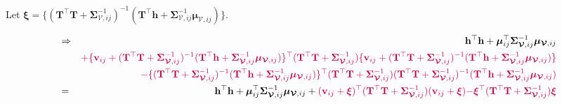 \documentclass[12pt]{article}
\newcommand{\0}{\mathbf{0}}
\begin{document}
Let $\boldsymbol{\xi} = \{ ( \mathbf{T}^{\top} \mathbf{T} + \boldsymbol{\Sigma}_{\boldsymbol{\mathcal{V}}, ij}^{-1} )^{-1} ( \mathbf{T}^{\top} \mathbf{h} + \boldsymbol{\Sigma}_{\boldsymbol{\mathcal{V}}, ij}^{-1}\boldsymbol{\mu}_{\boldsymbol{\mathcal{V}}, ij} ) \}$.

\begin{eqnarray*}
& \Rightarrow & \mathbf{h}^{\top} \mathbf{h} + \boldsymbol{\mu}_{ij}^{\top} \boldsymbol{\Sigma}_{\boldsymbol{\mathcal{V}}, ij}^{-1} \boldsymbol{\mu}_{\boldsymbol{\mathcal{V}}, ij} \\
&& \textcolor{purple}{  +  \{ \mathbf{v}_{ij} + ( \mathbf{T}^{\top} \mathbf{T} + \boldsymbol{\Sigma}_{\boldsymbol{\mathcal{V}}, ij}^{-1} )^{-1} ( \mathbf{T}^{\top} \mathbf{h} + \boldsymbol{\Sigma}_{\boldsymbol{\mathcal{V}}, ij}^{-1}\boldsymbol{\mu}_{\boldsymbol{\mathcal{V}}, ij} )  \}^{\top} ( \mathbf{T}^{\top} \mathbf{T} + \boldsymbol{\Sigma}_{\boldsymbol{\mathcal{V}}, ij}^{-1} ) }\textcolor{purple}{ \{ \mathbf{v}_{ij} + ( \mathbf{T}^{\top} \mathbf{T} + \boldsymbol{\Sigma}_{\boldsymbol{\mathcal{V}}, ij}^{-1} )^{-1}  ( \mathbf{T}^{\top} \mathbf{h} + \boldsymbol{\Sigma}_{\boldsymbol{\mathcal{V}}, ij}^{-1}\boldsymbol{\mu}_{\boldsymbol{\mathcal{V}}, ij} ) \} } \\
&&\textcolor{purple}{  - \{ ( \mathbf{T}^{\top} \mathbf{T} + \boldsymbol{\Sigma}_{\boldsymbol{\mathcal{V}}, ij}^{-1} )^{-1} ( \mathbf{T}^{\top} \mathbf{h} + \boldsymbol{\Sigma}_{\boldsymbol{\mathcal{V}}, ij}^{-1}\boldsymbol{\mu}_{\boldsymbol{\mathcal{V}}, ij} ) \}^{\top}} \textcolor{purple}{ ( \mathbf{T}^{\top} \mathbf{T} + \boldsymbol{\Sigma}_{\boldsymbol{\mathcal{V}}, ij}^{-1} ) ( \mathbf{T}^{\top} \mathbf{T} + \boldsymbol{\Sigma}_{\boldsymbol{\mathcal{V}}, ij}^{-1} )^{-1} ( \mathbf{T}^{\top} \mathbf{h} + \boldsymbol{\Sigma}_{\boldsymbol{\mathcal{V}}, ij}^{-1}\boldsymbol{\mu}_{\boldsymbol{\mathcal{V}}, ij} ) } \\
& = & \mathbf{h}^{\top} \mathbf{h} + \boldsymbol{\mu}_{ij}^{\top} \boldsymbol{\Sigma}_{\boldsymbol{\mathcal{V}}, ij}^{-1} \boldsymbol{\mu}_{\boldsymbol{\mathcal{V}}, ij} + \textcolor{purple}{ ( \mathbf{v}_{ij} + \boldsymbol{\xi} )^{\top} ( \mathbf{T}^{\top} \mathbf{T} + \boldsymbol{\Sigma}_{\boldsymbol{\mathcal{V}}, ij}^{-1} ) ( \mathbf{v}_{ij} + \boldsymbol{\xi} ) }\textcolor{purple}{ - \boldsymbol{\xi}^{\top} ( \mathbf{T}^{\top} \mathbf{T} + \boldsymbol{\Sigma}_{\boldsymbol{\mathcal{V}}, ij}^{-1} ) \boldsymbol{\xi}}
\end{eqnarray*}
\end{document}
